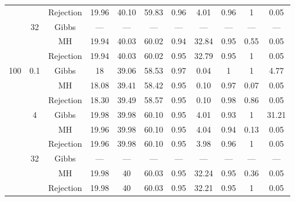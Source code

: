 {\begin{tabular}{ccccccccccc}
   \vspace{0.2cm} &  & Rejection & 19.96 & 40.10 & 59.83 & 0.96 & 4.01 & 0.96 & 1 & 0.05 \\ 
   & 32 & Gibbs & --- & --- & --- & --- & --- & --- & --- & --- \\ 
   &  & MH & 19.94 & 40.03 & 60.02 & 0.94 & 32.84 & 0.95 & 0.55 & 0.05 \\ 
   &  & Rejection & 19.94 & 40.03 & 60.02 & 0.95 & 32.79 & 0.95 & 1 & 0.05 \\ 
   \cmidrule{1-11} 
 100 & 0.1 & Gibbs & 18 & 39.06 & 58.53 & 0.97 & 0.04 & 1 & 1 & 4.77 \\ 
   &  & MH & 18.08 & 39.41 & 58.42 & 0.95 & 0.10 & 0.97 & 0.07 & 0.05 \\ 
   \vspace{0.2cm} &  & Rejection & 18.30 & 39.49 & 58.57 & 0.95 & 0.10 & 0.98 & 0.86 & 0.05 \\ 
   & 4 & Gibbs & 19.98 & 39.98 & 60.10 & 0.95 & 4.01 & 0.93 & 1 & 31.21 \\ 
   &  & MH & 19.96 & 39.98 & 60.10 & 0.95 & 4.04 & 0.94 & 0.13 & 0.05 \\ 
   \vspace{0.2cm} &  & Rejection & 19.96 & 39.98 & 60.10 & 0.95 & 3.98 & 0.96 & 1 & 0.05 \\ 
   & 32 & Gibbs & --- & --- & --- & --- & --- & --- & --- & --- \\ 
   &  & MH & 19.98 & 40 & 60.03 & 0.95 & 32.24 & 0.95 & 0.36 & 0.05 \\ 
   &  & Rejection & 19.98 & 40 & 60.03 & 0.95 & 32.21 & 0.95 & 1 & 0.05 \\ 
   \bottomrule 
\end{tabular}
}
